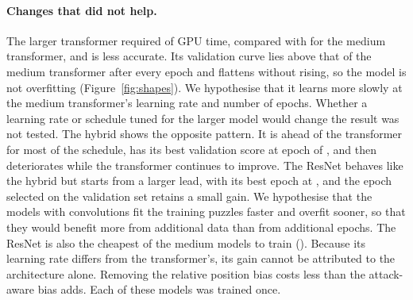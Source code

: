\documentclass[11pt]{article}
\begin{document}
\paragraph{Changes that did not help.}
\ifchangelarger
The larger transformer required  of
GPU time, compared with  for the
medium transformer, and is less accurate. Its validation curve lies above
that of the medium transformer after every epoch and flattens without
rising, so the model is not overfitting (Figure~\ref{fig:shapes}). We
hypothesise that it learns more slowly at the medium transformer's learning
rate and number of epochs. Whether a learning rate or schedule tuned for the
larger model would change the result was not tested.
\fi
\ifchangehybrid
The hybrid shows the opposite pattern. It is ahead of the transformer for
most of the schedule, has its best validation score at epoch
 of ,
and then deteriorates while the transformer continues to improve.
\fi
\ifchangeconv
The ResNet behaves like the hybrid but starts from a larger lead, with its
best epoch at , and the epoch selected on
the validation set retains a small gain. We hypothesise that the models with
convolutions fit the training puzzles faster and overfit sooner, so that
they would benefit more from additional data than from additional epochs. The
ResNet is also the cheapest of the medium models to train
(). Because its learning rate differs from
the transformer's, its gain cannot be attributed to the architecture alone.
\fi
\ifchangegeometry
Removing the relative position bias costs less than the attack-aware bias
adds.
\fi
Each of these models was trained once.
\fi



\ifgames
\end{document}
